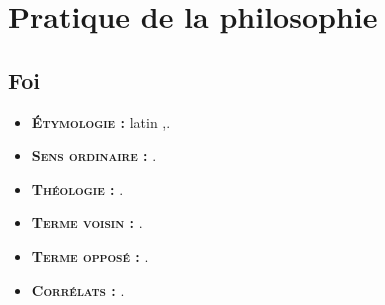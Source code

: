 
\section{Pratique de la philosophie}

\subsection{Foi}


\begin{itemize}[leftmargin=1cm, label=, itemsep=1pt]
\item {\bf \textsc{Étymologie} :} latin {\it },.
\item {\bf \textsc{Sens ordinaire} :} .
\item {\bf \textsc{Théologie} :} .
\end{itemize}

\begin{itemize}[leftmargin=1cm, label=, itemsep=1pt]
\item {\bf \textsc{Terme voisin} :} .
\item {\bf \textsc{Terme opposé} :} .
\item {\bf \textsc{Corrélats} :} .
\end{itemize}

